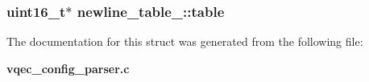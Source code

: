 \subsubsection{\setlength{\rightskip}{0pt plus 5cm}uint16\_\-t$\ast$ \bf{newline\_\-table\_\-::table}}\label{structnewline__table___3609c962099dbda0487bb499e819f6ca}




The documentation for this struct was generated from the following file:\begin{CompactItemize}
\item 
\bf{vqec\_\-config\_\-parser.c}\end{CompactItemize}
